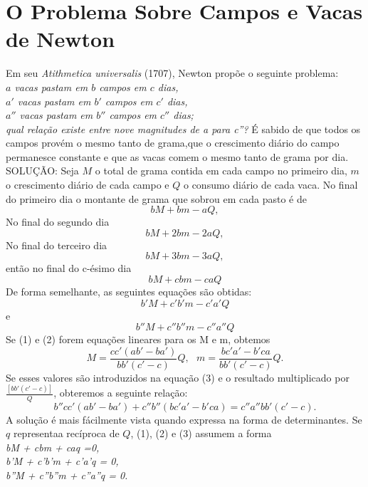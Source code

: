 \section{O Problema Sobre Campos e Vacas de Newton}
Em seu \textit{Atithmetica universalis} (1707), Newton propõe o seguinte problema:
\textit{\\
$a$ vacas pastam em $b$ campos em $c$ dias,\\                        
$a'$ vacas pastam em $b'$ campos em $c'$ dias,\\
$a''$ vacas pastam em $b''$ campos em $c''$ dias;\\
qual relação existe entre nove magnitudes de a para c''?}
É sabido de que todos os campos provém o mesmo tanto de grama,que o crescimento diário do campo permanesce constante e que as vacas comem o mesmo tanto de grama por dia.
SOLUÇÃO: Seja $M$ o total de grama contida em cada campo no primeiro dia, $m$ o crescimento diário de cada campo e $Q$ o consumo diário de cada vaca.
No final do primeiro dia o montante de grama que sobrou em cada pasto é de
$$bM + bm - aQ,$$ 
No final do segundo dia
$$bM + 2bm - 2aQ,$$ 
No final do terceiro dia
$$bM + 3bm - 3aQ,$$
então no final do c-ésimo dia
\begin{equation}
bM + cbm - caQ                                         
\end{equation}                                      
De forma semelhante, as seguintes equações são obtidas:
\begin{equation}
b'M + c'b'm - c'a'Q                                         
\end{equation}
e
\begin{equation}
b''M + c''b''m - c''a''Q                                         
\end{equation}
Se (1) e (2) forem equações lineares para os M e m, obtemos
$$M=\frac{cc'(ab' - ba')}{bb'(c'-c)}Q,\textrm{  } m=\frac{bc'a' - b'ca}{bb'(c'-c)}Q.$$
Se esses valores são introduzidos na equação (3) e o resultado multiplicado por $\frac{[bb'(c' - c)]}{Q}$, obteremos a seguinte relação:
$$b''cc'(ab'-ba') + c''b''(bc'a' - b'ca) = c''a''bb'(c'- c).$$
A solução é mais fácilmente vista quando expressa na forma de determinantes. Se $q$ representaa recíproca de $Q$, (1), (2) e (3) assumem a forma\\
\textit{bM + cbm + caq =0, \\ 
b'M + c'b'm + c'a'q = 0, \\ 
b''M + c''b''m + c''a''q = 0.}
